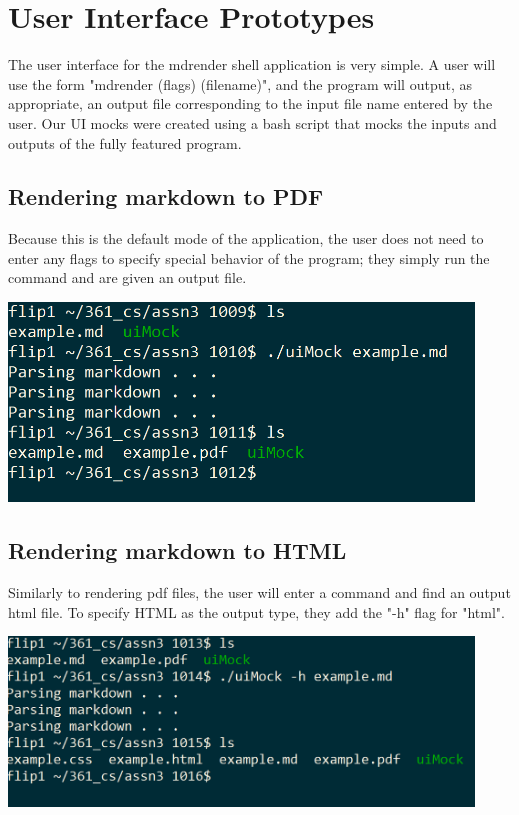 \section{User Interface Prototypes}

The user interface for the mdrender shell application is very simple. A user will use the form "mdrender (flags) (filename)", and the program will output, as appropriate, an output file corresponding to the input file name entered by the user. Our UI mocks were created using a bash script that mocks the inputs and outputs of the fully featured program.

\subsection{Rendering markdown to PDF}

Because this is the default mode of the application, the user does not need to enter any flags to specify special behavior of the program; they simply run the command and are given an output file.

\noindent\includegraphics[width=350pt]{images/mdrender_pdf.png}

\subsection{Rendering markdown to HTML}

Similarly to rendering pdf files, the user will enter a command and find an output html file. To specify HTML as the output type, they add the "-h" flag for "html".

\noindent\includegraphics[width=350pt]{images/mdrender_html.png}
